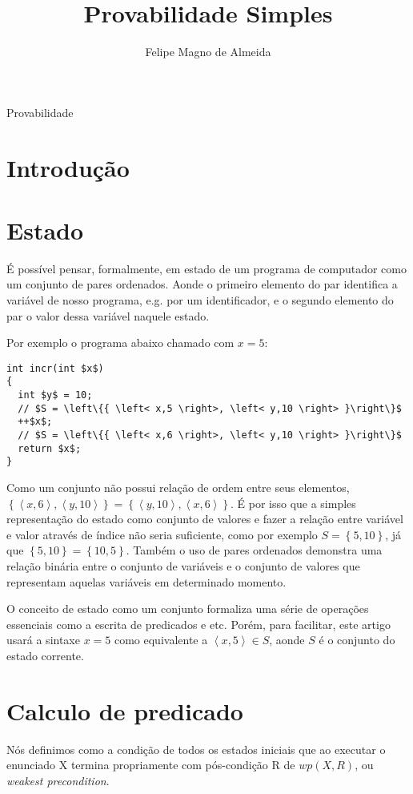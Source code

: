 \documentclass[12pt]{article}
\title{Provabilidade Simples}
\author{Felipe Magno de Almeida}
\begin{document}
 

\maketitle
     
\begin{resumo} 

  Provabilidade

\end{resumo}

\section{Introdução}

\section{Estado}

É possível pensar, formalmente, em estado de um programa de computador
como um conjunto de pares ordenados. Aonde o primeiro elemento do par
identifica a variável de nosso programa, e.g. por um identificador, e
o segundo elemento do par o valor dessa variável naquele estado.

Por exemplo o programa abaixo chamado com $x=5$:

\begin{lstlisting}[mathescape=true]
int incr(int $x$)
{
  int $y$ = 10;
  // $S = \left\{{ \left< x,5 \right>, \left< y,10 \right> }\right\}$
  ++$x$;
  // $S = \left\{{ \left< x,6 \right>, \left< y,10 \right> }\right\}$
  return $x$;
}
\end{lstlisting}

Como um conjunto não possui relação de ordem entre seus elementos,
$\left\{{ \left< x,6 \right>, \left< y,10 \right> }\right\} = \left\{{
    \left< y,10 \right>, \left< x,6 \right> }\right\}$. É por isso que
a simples representação do estado como conjunto de valores e fazer a
relação entre variável e valor através de índice não seria suficiente,
como por exemplo $S = \left\{{5,10}\right\}$, já que
$\left\{{5,10}\right\} = \left\{{10,5}\right\}$. Também o uso de pares
ordenados demonstra uma relação binária entre o conjunto de variáveis
e o conjunto de valores que representam aquelas variáveis em
determinado momento.

O conceito de estado como um conjunto formaliza uma série de operações
essenciais como a escrita de predicados e etc. Porém, para facilitar,
este artigo usará a sintaxe $x = 5$ como equivalente a
$\left<x,5\right> \in S$, aonde $S$ é o conjunto do estado corrente.

\section{Calculo de predicado}

Nós definimos como a condição de todos os estados iniciais que ao
executar o enunciado X termina propriamente com pós-condição R de $wp(X,
R)$, ou \emph{weakest precondition}.
\end{document}
